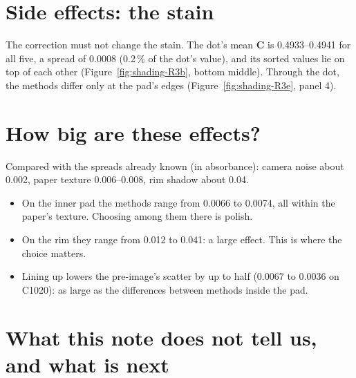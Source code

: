 \documentclass[11pt,letterpaper]{article}
\newcommand{\mC}{\mathbf{C}}   %
\begin{document}
\section{Side effects: the stain}

The correction must not change the stain.  The dot's mean $\mC$ is
0.4933--0.4941 for all five, a spread of 0.0008 (0.2\,\% of the dot's
value), and its sorted values lie on top of each other
(Figure~\ref{fig:shading-R3b}, bottom middle).  Through the dot, the
methods differ only at the pad's edges (Figure~\ref{fig:shading-R3e},
panel 4).

\section{How big are these effects?}

Compared with the spreads already known (in absorbance): camera noise
about 0.002, paper texture 0.006--0.008, rim shadow about 0.04.
\begin{itemize}
  \item On the inner pad the methods range from 0.0066 to 0.0074, all
    within the paper's texture.  Choosing among them there is polish.
  \item On the rim they range from 0.012 to 0.041: a large effect.  This is
    where the choice matters.
  \item Lining up lowers the pre-image's scatter by up to half (0.0067 to
    0.0036 on C1020): as large as the differences between methods inside
    the pad.
\end{itemize}

\section{What this note does not tell us, and what is next}
\label{sec:open}
\end{document}
